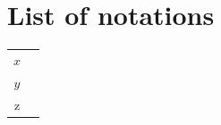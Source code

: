 \documentclass{article}
\begin{document}
\section*{List of notations}
\begin{longtable}{cc}
$x$\label{a} & \pageref{a}\\
$y$\label{b} & \pageref{b}\\
z\label{c} & \pageref{c}\\
\end{longtable}
\end{document}
